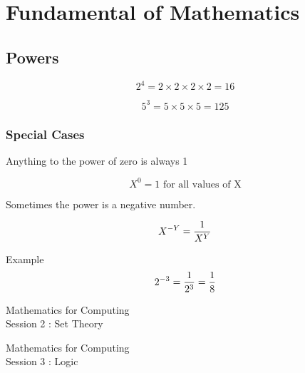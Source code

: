 \documentclass[]{report}
\begin{document}
\section{Fundamental of Mathematics}

\subsection{Powers}

\[  2^ 4 = 2 \times 2 \times 2 \times 2 = 16 \]

\[  5^ 3 = 5 \times 5 \times 5 =125 \]

\subsubsection{Special Cases}

Anything to the power of zero is always 1

\[  X^ 0 = 1 \mbox{ for all values of X} \]

Sometimes the power is a negative number.

\[  X^{-Y} = { 1 \over X^Y}  \]

Example 
\[  2^{-3} = { 1 \over 2^3} = { 1 \over 8}  \]


\newpage
\begin{center}
	\huge{Mathematics for Computing}\\
	{\LARGE Session 2 : Set Theory}
\end{center}


\newpage
\newpage
\begin{center}
	\huge{Mathematics for Computing}\\
	{\LARGE Session 3 : Logic}
\end{center}


\end{document}
